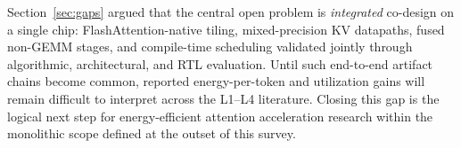 \documentclass[conference]{IEEEtran}
\begin{document}
Section~\ref{sec:gaps} argued that the central open problem is \emph{integrated} co-design on a single chip: FlashAttention-native tiling, mixed-precision KV datapaths, fused non-GEMM stages, and compile-time scheduling validated jointly through algorithmic, architectural, and RTL evaluation.
Until such end-to-end artifact chains become common, reported energy-per-token and utilization gains will remain difficult to interpret across the L1--L4 literature.
Closing this gap is the logical next step for energy-efficient attention acceleration research within the monolithic scope defined at the outset of this survey.


\begingroup
\raggedright

\endgroup
\end{document}
